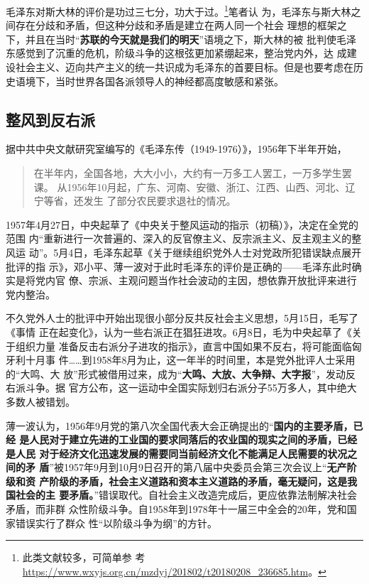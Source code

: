 毛泽东对斯大林的评价是功过三七分，功大于过。\footnote{此类文献较多，可简单参
  考\url{https://www.wxyjs.org.cn/mzdyj/201802/t20180208_236685.htm}。}笔者认
为，毛泽东与斯大林之间存在分歧和矛盾，但这种分歧和矛盾是建立在两人同一个社会
理想的框架之下，并且在当时“\textbf{苏联的今天就是我们的明天}”语境之下，斯大林的被
批判使毛泽东感觉到了沉重的危机，阶级斗争的这根弦更加紧绷起来，整治党内外，达
成建设社会主义、迈向共产主义的统一共识成为毛泽东的首要目标。但是也要考虑在历
史语境下，当时世界各国各派领导人的神经都高度敏感和紧张。

\subsection{整风到反右派}

据中共中央文献研究室编写的《毛泽东传（1949-1976）》，1956年下半年开始，
\begin{quotation}
  在半年内，全国各地，大大小小，大约有一万多工人罢工，一万多学生罢课。
  从1956年10月起，广东、河南、安徽、浙江、江西、山西、河北、辽宁等省，还发生
  了部分农民要求退社的情况。
\end{quotation}

1957年4月27日，中央起草了《中央关于整风运动的指示（初稿）》，决定在全党的范围
内“重新进行一次普遍的、深入的反官僚主义、反宗派主义、反主观主义的整风运
动”。5月4日，毛泽东起草《关于继续组织党外人士对党政所犯错误缺点展开批评的指
示》，邓小平、薄一波对于此时毛泽东的评价是正确的——毛泽东此时确实是将党内官
僚、宗派、主观问题当作社会波动的主因，想依靠开放批评来进行党内整治。

不久党外人士的批评中开始出现很小部分反共反社会主义思想，5月15日，毛写了《事情
正在起变化》，认为一些右派正在猖狂进攻。6月8日，毛为中央起草了《关于组织力量
准备反击右派分子进攻的指示》，直言中国如果不反右，将可能面临匈牙利十月事
件……到1958年8月为止，这一年半的时间里，本是党外批评人士采用的“大鸣、大
放”形式被借用过来，成为“\textbf{大鸣、大放、大争辩、大字报}”，发动反右派斗争。据
官方公布，这一运动中全国实际划归右派分子55万多人，其中绝大多数人被错划。

薄一波认为，1956年9月党的第八次全国代表大会正确提出的“\textbf{国内的主要矛盾，已经
  是人民对于建立先进的工业国的要求同落后的农业国的现实之间的矛盾，已经是人民
  对于经济文化迅速发展的需要同当前经济文化不能满足人民需要的状况之间的矛
  盾}”被1957年9月到10月9日召开的第八届中央委员会第三次会议上“\textbf{无产阶级和资
  产阶级的矛盾，社会主义道路和资本主义道路的矛盾，毫无疑问，这是我国社会的主
  要矛盾。}”错误取代。自社会主义改造完成后，更应依靠法制解决社会矛盾，而非群
众性阶级斗争。自1958年到1978年十一届三中全会的20年，党和国家错误实行了群众
性“以阶级斗争为纲”的方针。\cite[620-632]{boyibo}


